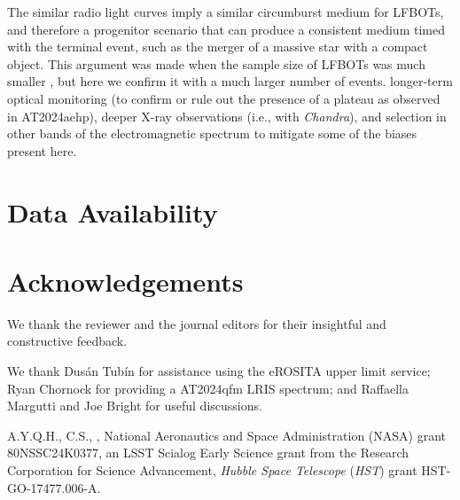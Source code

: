 \documentclass[twocolumn,twocolappendix, linenumbers, trackchanges]{aastex7}
\begin{document}
The similar radio light curves imply a similar circumburst medium for LFBOTs, and therefore a progenitor scenario that can produce a consistent medium timed with the terminal event, such as the merger of a massive star with a compact object. This argument was made when the sample size of LFBOTs was much smaller \citep{metzger2022}, but here we confirm it with a much larger number of events. 
 longer-term optical monitoring (to confirm or rule out the presence of a plateau as observed in AT2024aehp), deeper X-ray observations (i.e., with \emph{Chandra}), and selection in other bands of the electromagnetic spectrum to mitigate some of the biases present here. 

\section{Data Availability}

\section{Acknowledgements}
We thank the reviewer and the journal editors for their insightful and constructive feedback.

We thank Dusán Tubín for assistance using the eROSITA upper limit service; Ryan Chornock for providing a AT2024qfm LRIS spectrum; and Raffaella Margutti and Joe Bright for useful discussions.

A.Y.Q.H., C.S., , National Aeronautics and Space Administration (NASA) grant 80NSSC24K0377, an LSST Scialog Early Science grant from the Research Corporation for Science Advancement, {\it Hubble Space Telescope} ({\it HST}) grant HST-GO-17477.006-A. 
\end{document}
